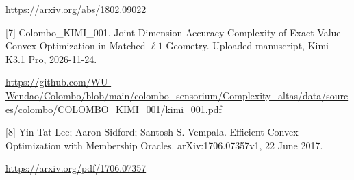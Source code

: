 \documentclass[10pt,a4paper]{article}
\begin{document}
\url{https://arxiv.org/abs/1802.09022}



[7] Colombo\_KIMI\_001. Joint Dimension-Accuracy Complexity of Exact-Value Convex Optimization in Matched $\ell 1$ Geometry. Uploaded manuscript, Kimi K3.1 Pro, 2026-11-24.



\url{https://github.com/WU-Wendao/Colombo/blob/main/colombo_sensorium/Complexity_altas/data/sources/colombo/COLOMBO_KIMI_001/kimi_001.pdf}



[8] Yin Tat Lee; Aaron Sidford; Santosh S. Vempala. Efficient Convex Optimization with Membership Oracles. arXiv:1706.07357v1, 22 June 2017.



\url{https://arxiv.org/pdf/1706.07357}
\end{document}
